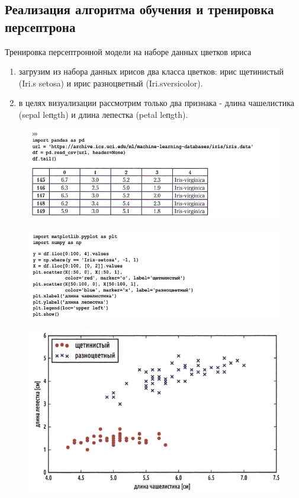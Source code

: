 \documentclass{beamer}
\begin{document}
\subsection{Реализация алгоритма обучения и тренировка персептрона}
\begin{frame}[t]
Тренировка персептронной модели на наборе данных цветков ириса
\begin{enumerate}
\item загрузим из набора данных ирисов два класса цветков: ирис щетинистый (Iri.s setosa) и ирис разноцветный (Iri.sversicolor). 
\item в целях визуализации рассмотрим только два признака - длина
чашелистика (sepal leпgth) и длина лепестка (petal leпgth).
\end{enumerate}
\begin{figure}[h]
\centering
\includegraphics[scale=0.5]{images/lec03-pic12.png}
\end{figure}
\end{frame}

\begin{frame}[t]
\begin{figure}[h]
\centering
\includegraphics[scale=0.5]{images/lec03-pic13.png}
\end{figure}
\begin{figure}[h]
\centering
\includegraphics[scale=0.4]{images/lec03-pic14.png}
\end{figure}
\end{frame}
\end{document}
